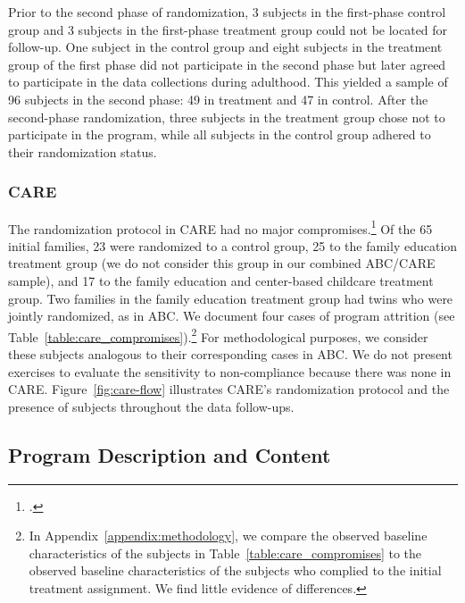 \noindent Prior to the second phase of randomization, 3 subjects in the first-phase control group and 3 subjects in the first-phase treatment group could not be located for follow-up. One subject in the control group and eight subjects in the treatment group of the first phase did not participate in the second phase but later agreed to participate in the data collections during adulthood. This yielded a sample of 96 subjects in the second phase: 49 in treatment and 47 in control. After the second-phase randomization, three subjects in the treatment group chose not to participate in the program, while all subjects in the control group adhered to their randomization status. \\

\subsubsection{CARE}

\noindent The randomization protocol in CARE had no major compromises.\footnote{\citet{Wasik_Ramey_etal_1990_CD,Burchinal_Campbell_etal_1997_CD}.} Of the 65 initial families, 23 were randomized to a control group, 25 to the family education treatment group (we do not consider this group in our combined ABC/CARE sample), and 17 to the family education and center-based childcare treatment group. Two families in the family education treatment group had twins who were jointly randomized, as in ABC. We document four cases of program attrition (see Table~\ref{table:care_compromises}).\footnote{In Appendix~\ref{appendix:methodology}, we compare the observed baseline characteristics of the subjects in Table~\ref{table:care_compromises} to the observed baseline characteristics of the subjects who complied to the initial treatment assignment. We find little evidence of differences.} For methodological purposes, we consider these subjects analogous to their corresponding cases in ABC. We do not present exercises to evaluate the sensitivity to non-compliance because there was none in CARE. Figure~\ref{fig:care-flow} illustrates CARE's randomization protocol and the presence of subjects throughout the data follow-ups.\\




\subsection{Program Description and Content}

